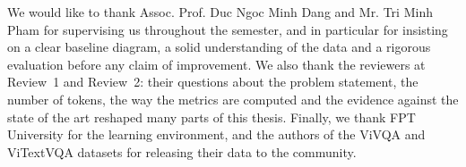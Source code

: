 
\begin{acknowledgements}

We would like to thank Assoc. Prof. Duc Ngoc Minh Dang and Mr. Tri Minh Pham for
supervising us throughout the semester, and in particular for insisting on a clear
baseline diagram, a solid understanding of the data and a rigorous evaluation
before any claim of improvement. We also thank the reviewers at Review~1 and
Review~2: their questions about the problem statement, the number of tokens, the
way the metrics are computed and the evidence against the state of the art
reshaped many parts of this thesis. Finally, we thank FPT University for the
learning environment, and the authors of the ViVQA and ViTextVQA datasets for
releasing their data to the community.

\end{acknowledgements}
